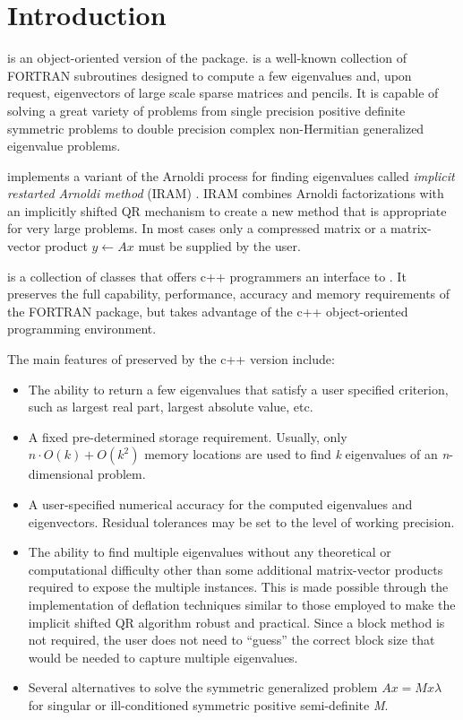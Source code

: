 \chapter{Introduction}

\ARPP{} is an object-oriented version of the \ARP{} package. \ARP{} \cite{Lehoucq:1997:ARPACK} is a well-known collection of FORTRAN subroutines designed to compute a few eigenvalues and, upon request, eigenvectors of large scale sparse matrices and pencils. It is capable of solving a great variety of problems from single precision positive definite symmetric problems to double precision complex non-Hermitian generalized eigenvalue problems. 

\ARP{} implements a variant of the Arnoldi process for finding eigenvalues called \textit{implicit restarted Arnoldi method} (IRAM) \cite{Sorensen:1992:IAP, Sorensen:1996:IRA}. IRAM combines Arnoldi factorizations with an implicitly shifted QR mechanism to create a new method that is appropriate for very large problems. In most cases only a compressed matrix or a matrix-vector product $y\leftarrow Ax$ must be supplied by the user.

\ARPP{} is a collection of classes that offers c++ programmers an interface to \ARP{}. It preserves the full capability, performance, accuracy and memory requirements of the FORTRAN package, but takes advantage of the c++ object-oriented programming environment.

The main features of \ARP{} preserved by the c++ version include:

\begin{itemize}
	\item The ability to return a few eigenvalues that satisfy a user specified criterion, such as largest real part, largest absolute value, etc.
	\item A fixed pre-determined storage requirement. Usually, only $n\cdot O(k)+O(k^2)$ memory locations are used to find \textit{k} eigenvalues of an \textit{n}-dimensional problem.
	\item A user-specified numerical accuracy for the computed eigenvalues and eigenvectors. Residual tolerances may be set to the level of working precision.
	\item The ability to find multiple eigenvalues without any theoretical or computational difficulty other than some additional matrix-vector products required to expose the multiple instances. This is made possible through the implementation of deflation techniques similar to those employed to make the implicit shifted QR algorithm robust and practical. Since a block method is not required, the user does not need to “guess” the correct block size that would be needed to capture multiple eigenvalues.
	\item Several alternatives to solve the symmetric generalized problem $Ax=Mx\lambda$ for singular or ill-conditioned symmetric positive semi-definite \textit{M}.
\end{itemize}


